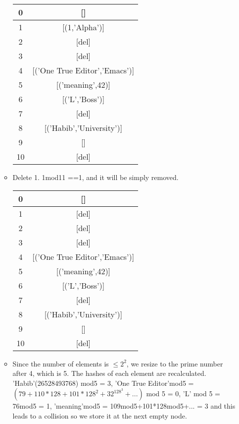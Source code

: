 \documentclass{article}
\begin{document}
\begin{enumerate}
\begin{itemize}
\begin{center}
				\begin{tabular}{ |c|c| } 
					\hline
					0 & []   \\ 
					\hline
					1 &	[(1,'Alpha')] \\
					\hline 
					2 & [del]  \\ 
					\hline
					3&[del]\\
					\hline
					4&[('One True Editor','Emacs')]\\
					\hline
					5&[('meaning',42)]\\
					\hline
					6&[('L','Boss')]\\
					\hline
					7&[del]\\
					\hline
					8&[('Habib','University')]\\
					\hline
					9&[]\\
					\hline
					10&[del]\\
					\hline
				\end{tabular}
			\end{center}
			\item Delete 1. 1mod11 ==1, and it will be simply removed.
			\begin{center}
				\begin{tabular}{ |c|c| } 
					\hline
					0 & []   \\ 
					\hline
					1 &	[del] \\
					\hline 
					2 & [del]  \\ 
					\hline
					3&[del]\\
					\hline
					4&[('One True Editor','Emacs')]\\
					\hline
					5&[('meaning',42)]\\
					\hline
					6&[('L','Boss')]\\
					\hline
					7&[del]\\
					\hline
					8&[('Habib','University')]\\
					\hline
					9&[]\\
					\hline
					10&[del]\\
					\hline
				\end{tabular}
			\end{center}
			\item Since the number of elements is $\leq 2^2$, we resize to the prime number after 4, which is 5. The hashes of each element are recalculated. 'Habib'(26528493768) mod5 = 3, 'One True Editor'mod5 = $(79+110*128 + 101*128^2 + 32^128^3+...)$ mod 5 = 0, 'L' mod 5 = 76mod5 = 1, 'meaning'mod5 = 109mod5+101*128mod5+... = 3 and this leads to a collision so we store it at the next empty node.

\end{itemize}
\end{enumerate}
\end{document}
